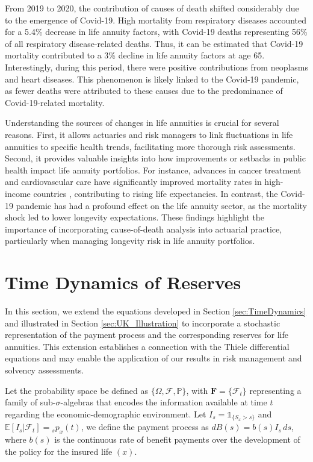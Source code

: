 \documentclass[12pt]{article}
\begin{document}
{From 2019 to 2020, the contribution of causes of death shifted considerably due to the emergence of Covid-19. High mortality from respiratory diseases accounted for a 5.4\% decrease in life annuity factors, with Covid-19 deaths representing 56\% of all respiratory disease-related deaths. Thus, it can be estimated that Covid-19 mortality contributed to a 3\% decline in life annuity factors at age 65. Interestingly, during this period, there were positive contributions from neoplasms and heart diseases. This phenomenon is likely linked to the Covid-19 pandemic, as fewer deaths were attributed to these causes due to the predominance of Covid-19-related mortality.

Understanding the sources of changes in life annuities is crucial for several reasons. First, it allows actuaries and risk managers to link fluctuations in life annuities to specific health trends, facilitating more thorough risk assessments. Second, it provides valuable insights into how improvements or setbacks in public health impact life annuity portfolios. For instance, advances in cancer treatment and cardiovascular care have significantly improved mortality rates in high-income countries \citep{weber2023gains}, contributing to rising life expectancies. In contrast, the Covid-19 pandemic has had a profound effect on the life annuity sector, as the mortality shock led to lower longevity expectations. These findings highlight the importance of incorporating cause-of-death analysis into actuarial practice, particularly when managing longevity risk in life annuity portfolios.


\FloatBarrier
\section{Time Dynamics of Reserves}\label{sec:Reserves}

In this section, we extend the equations developed in Section \ref{sec:TimeDynamics} and illustrated in Section \ref{sec:UK_Illustration} to incorporate a stochastic representation of the payment process and the corresponding reserves for life annuities. This extension establishes a connection with the Thiele differential equations and may enable the application of our results in risk management and solvency assessments.

Let the probability space be defined as \( \{\Omega, \mathcal{F}, \mathbb{P}\} \), with \(\textbf{F} = \{\mathcal{F}_t\}\) representing a family of sub-\(\sigma\)-algebras that encodes the information available at time \( t \) regarding the economic-demographic environment. Let \( I_{s} = \mathds{1}_{\{S_x > s\}} \) and \( \mathbb{E}[I_{s} | \mathcal{F}_t] = {}_s p_x(t) \), we define the payment process as \( dB(s) = b(s) I_{s} \, ds \), where \( b(s) \) is the continuous rate of benefit payments over the development of the policy for the insured life \( (x) \).


}
\end{document}
